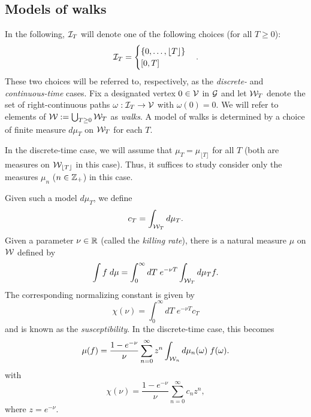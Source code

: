 

\subsection{Models of walks}

In the following, $\mathcal{I}_T$ will denote one of the following choices (for all $T \ge 0$):
\begin{equation}
\mathcal{I}_T
  =
\begin{cases}
\{ 0, \ldots, \lfloor T \rfloor \} \\
[0, T]
\end{cases}.
\end{equation}
These two choices will be referred to, respectively, as the \emph{discrete-} and
\emph{continuous-time} cases.
Fix a designated vertex $0 \in \mathcal{V}$ in $\mathcal{G}$ and
let $\mathcal{W}_T$ denote the set of
right-continuous paths $\omega : \mathcal{I}_T \rightarrow \mathcal{V}$ with $\omega(0) = 0$.
We will refer to elements of $\mathcal{W} := \bigcup_{T \geq 0} \mathcal{W}_T$ as \emph{walks}.
A model of walks is determined by a choice of finite measure $d\mu_T$ on
$\mathcal{W}_T$ for each $T$.

In the discrete-time case, we will assume that
$\mu_T = \mu_{\lfloor T \rfloor}$ for all $T$ (both are measures on
$\mathcal{W}_{\lfloor T \rfloor}$ in this case). Thus, it suffices to study consider only
the measures $\mu_n$ ($n \in {\mathbb Z}_+$) in this case.

Given such a model $d\mu_T$, we define
\begin{equation}
c_T = \int_{\mathcal{W}_T} d\mu_T.
\end{equation}
Given a parameter $\nu \in {\mathbb R}$ (called the \emph{killing rate}),
there is a natural measure $\mu$ on $\mathcal{W}$ defined by
\begin{equation}
\int f \; d\mu
  =
\int_0^\infty dT \; e^{-\nu T} \int_{\mathcal{W}_T} d\mu_T f.
\end{equation}
The corresponding normalizing constant is given by
\begin{equation}
\chi(\nu) = \int_0^\infty dT \; e^{-\nu T} c_T
\end{equation}
and is known as the \emph{susceptibility}. In the discrete-time case, this becomes
\begin{equation}
\mu(f)
  =
\frac{1 - e^{-\nu}}{\nu} \sum_{n=0}^\infty z^n \int_{\mathcal{W}_n} d\mu_n(\omega) \; f(\omega).
\end{equation}
with
\begin{equation}
\chi(\nu) = \frac{1 - e^{-\nu}}{\nu} \sum_{n=0}^\infty c_n z^n,
\end{equation}
where $z = e^{-\nu}$.

